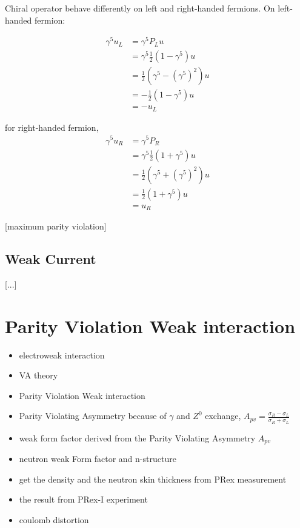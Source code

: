 Chiral operator behave differently on left and right-handed fermions. On left-handed fermion: 

\begin{equation}
\begin{split}
    \gamma^5u_L &= \gamma^5P_Lu \\
     &= \gamma^5 \frac{1}{2}(1-\gamma^5)u \\
     &= \frac{1}{2}(\gamma^5 - (\gamma^5)^2)u \\
     &= - \frac{1}{2}(1 - \gamma^5)u \\
     &= - u_L
\end{split}
\end{equation}

for right-handed fermion, 
\begin{equation}
\begin{split}
\gamma^5u_R &= \gamma^5P_R \\
     &= \gamma^5 \frac{1}{2}(1+\gamma^5)u \\
     &= \frac{1}{2}(\gamma^5 + (\gamma^5)^2)u \\
     &= \frac{1}{2}(1 + \gamma^5)u \\
     &= u_R
\end{split}
\end{equation}

 [maximum  parity violation]
 
\subsection{Weak Current}

[...]

\section{Parity Violation Weak interaction}

\begin{itemize}
    \item electroweak interaction
    \item VA theory
    \item Parity Violation Weak interaction
    \item Parity Violating Asymmetry because of $\gamma$ and $Z^0$ exchange, $A_{pv} = \frac{\sigma_R - \sigma_L}{\sigma_R + \sigma_L}$
    \item weak form factor derived from the Parity Violating Asymmetry  $A_{pv}$
    \item neutron weak Form factor and n-structure
    \item get the density and the neutron skin thickness from PRex measurement
    \item the result from PRex-I experiment
    \item coulomb distortion
\end{itemize}

